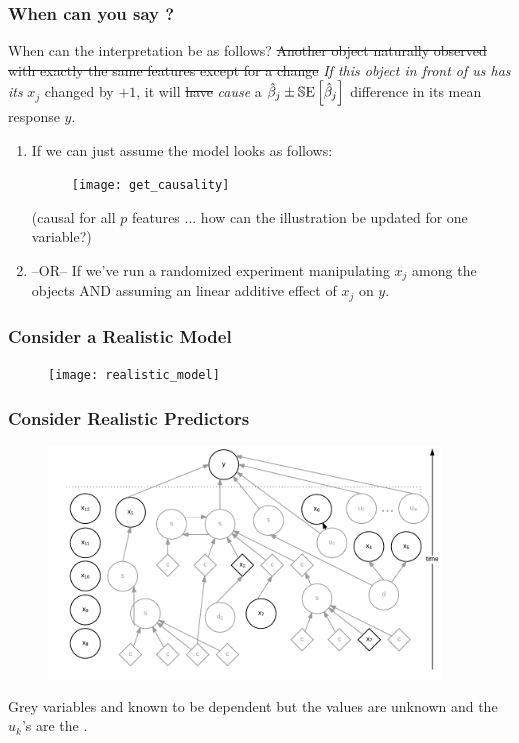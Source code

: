 \documentclass[slides]{beamer} %
\begin{document}
\begin{frame}\frametitle{When can you say ?}

\small

When can the interpretation be  as follows? \sout{Another object naturally observed with exactly the same features except for a change} \pause \emph{If this object in front of us has its} $x_j$ changed by $+1$, it will \sout{have} \pause  \emph{cause} a $\hat{\beta}_j \pm \mathbb{S}\text{E}\left[\hat{\beta}_j\right]$ difference in its mean response $y$.

\begin{enumerate}
\item If we can just assume the model looks as follows:

\vspace{-0.3cm}

\begin{figure}
\centering
\texttt{[image: get\_causality]}
\end{figure}

(causal for all $p$ features ... how can the illustration be updated for one variable?)  \pause 

\item --OR-- If we've run a randomized experiment manipulating $x_j$ among the objects AND assuming an linear additive effect of $x_j$ on $y$.
\end{enumerate}

\end{frame}

\begin{frame}\frametitle{Consider a Realistic Model}

\begin{figure}
\centering
\texttt{[image: realistic\_model]}
\end{figure}


\end{frame}

\begin{frame}\frametitle{Consider Realistic Predictors}

\begin{figure}
\centering
\includegraphics[width=4.1in]{realistic_predictors}
\end{figure}

Grey variables and known to be dependent but the values are unknown and the $u_k$'s are the .

\end{frame}
\end{document}
